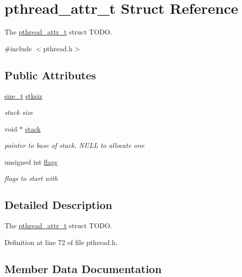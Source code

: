 \hypertarget{structpthread__attr__t}{}\section{pthread\+\_\+attr\+\_\+t Struct Reference}
\label{structpthread__attr__t}


The \mbox{\hyperlink{structpthread__attr__t}{pthread\+\_\+attr\+\_\+t}} struct T\+O\+DO.  




{\ttfamily \#include $<$pthread.\+h$>$}

\subsection*{Public Attributes}
\begin{DoxyCompactItemize}
\item 
\mbox{\hyperlink{size__t_8h_aa9d55e2f20e580b7445617d0d12fff6e}{size\+\_\+t}} \mbox{\hyperlink{structpthread__attr__t_ac10c79a6ec0a30ab5f839048b7b99a4f}{stksiz}}
\begin{DoxyCompactList}\small\item\em stack size \end{DoxyCompactList}\item 
void $\ast$ \mbox{\hyperlink{structpthread__attr__t_a47a8348284e6b8101fe23d6139f3e625}{stack}}
\begin{DoxyCompactList}\small\item\em pointer to base of stack, N\+U\+LL to allocate one \end{DoxyCompactList}\item 
unsigned int \mbox{\hyperlink{structpthread__attr__t_ae905ecfba5c079b5672c0c8035913291}{flags}}
\begin{DoxyCompactList}\small\item\em flags to start with \end{DoxyCompactList}\end{DoxyCompactItemize}


\subsection{Detailed Description}
The \mbox{\hyperlink{structpthread__attr__t}{pthread\+\_\+attr\+\_\+t}} struct T\+O\+DO. 

Definition at line 72 of file pthread.\+h.



\subsection{Member Data Documentation}
\mbox{\label{structpthread__attr__t_ae905ecfba5c079b5672c0c8035913291}} 

